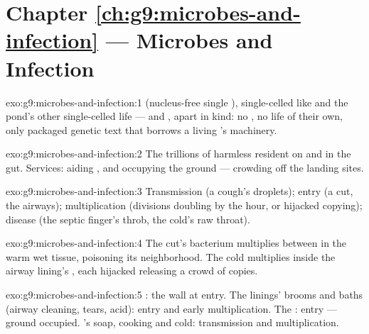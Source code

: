 \section*{Chapter \ref{ch:g9:microbes-and-infection} --- Microbes and Infection}

\begin{solution}{exo:g9:microbes-and-infection:1}
 (nucleus-free single ), single-celled 
like  and the pond's other single-celled life --- and
, apart in kind: no , no life of their own,
only packaged genetic text that borrows a living 's
machinery.
\end{solution}

\begin{solution}{exo:g9:microbes-and-infection:2}
The trillions of harmless  resident on  and in
the gut. Services: aiding , and occupying the
ground --- crowding  off the landing sites.
\end{solution}

\begin{solution}{exo:g9:microbes-and-infection:3}
Transmission (a cough's droplets); entry (a cut, the
airways); multiplication (divisions doubling by the hour,
or hijacked  copying); disease (the septic finger's
throb, the cold's raw throat).
\end{solution}

\begin{solution}{exo:g9:microbes-and-infection:4}
The cut's bacterium multiplies between  in the warm
wet tissue, poisoning its neighborhood. The cold 
multiplies inside the airway lining's , each
hijacked  releasing a crowd of copies.
\end{solution}

\begin{solution}{exo:g9:microbes-and-infection:5}
: the wall at entry. The linings' brooms and baths
(airway cleaning, tears,  acid): entry and early
multiplication. The : entry --- ground
occupied. 's soap, cooking and cold: transmission
and multiplication.
\end{solution}

